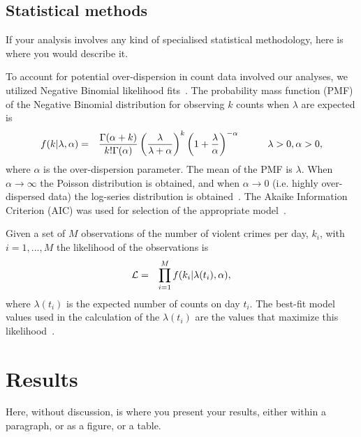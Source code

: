 \documentclass[12pt]{article}
\begin{document}
\subsection{Statistical methods}

If your analysis involves any kind of specialised statistical methodology, here is
where you would describe it.

To account for potential over-dispersion in count data involved our analyses, we utilized
Negative Binomial likelihood fits~\cite{lloyd2007maximum}. 
The probability mass function (PMF) of the Negative Binomial distribution for observing $k$
counts when $\lambda$ are expected is~\cite{lloyd2007maximum}
\begin{eqnarray}
f(k|\lambda,\alpha) & = &
{{\Gamma(\alpha+k)}\over{k! \Gamma(\alpha)}}
\left({{\lambda}\over{\lambda+\alpha}}\right)^k
\left(1+{{\lambda}\over{\alpha}}\right)^{-\alpha}
\hspace*{1cm} \lambda>0,\alpha>0,
\label{eqn:nb}
\end{eqnarray}
where $\alpha$ is the over-dispersion parameter.
The mean of the PMF is $\lambda$.
When $\alpha\rightarrow \infty$ the Poisson distribution is obtained, and when
$\alpha\rightarrow 0$ (i.e. highly over-dispersed data) 
the log-series distribution is obtained~\cite{lloyd2007maximum}.
The Akaike Information Criterion (AIC) was used for selection of the appropriate 
model~\cite{akaike1974new}.

Given a set of $M$ observations of the number of
violent crimes per day, $k_i$, with $i=1,...,M$
the likelihood of the observations is
\begin{eqnarray}
{{\cal{L}}} & = & \prod_{i=1}^{M} f(k_i|\lambda(t_i),\alpha),
\label{eqn:like}
\end{eqnarray}
where $\lambda(t_i)$ is the expected number of counts on day $t_i$.
The best-fit model values
used in the calculation of the $\lambda(t_i)$ are the values that maximize this
likelihood~\cite{cowan1998statistical}.


\section{Results}

Here, without discussion, is where you present your results, either within a
paragraph, or as a figure, or a table.
\end{document}
